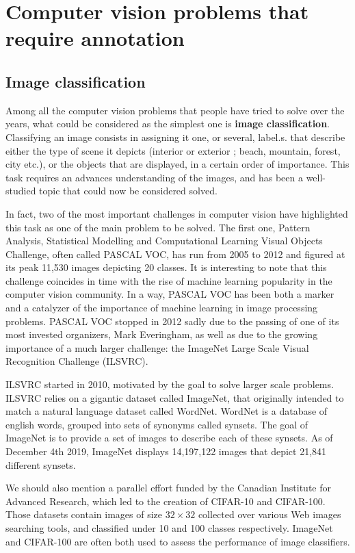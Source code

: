 \section{Computer vision problems that require annotation}
\label{sec:cv_annot} 

\subsection{Image classification} 
Among all the computer vision problems that people have tried to solve over the years, what could be considered as the simplest one is \textbf{image classification}. Classifying an image consists in assigning it one, or several, label.s. that describe either the type of scene it depicts (interior or exterior ; beach, mountain, forest, city etc.), or the objects that are displayed, in a certain order of importance. This task requires an advances understanding of the images, and has been a well-studied topic that could now be considered solved. 

In fact, two of the most important challenges in computer vision have highlighted this task as one of the main problem to be solved. The first one, Pattern Analysis, Statistical Modelling and Computational Learning Visual Objects Challenge, often called PASCAL VOC, has run from 2005 to 2012 and figured at its peak 11,530 images depicting 20 classes. It is interesting to note that this challenge coincides in time with the rise of machine learning popularity in the computer vision community. In a way, PASCAL VOC has been both a marker and a catalyzer of the importance of machine learning in image processing problems. PASCAL VOC stopped in 2012 sadly due to the passing of one of its most invested organizers, Mark Everingham, as well as due to the growing importance of a much larger challenge: the ImageNet Large Scale Visual Recognition Challenge (ILSVRC).

ILSVRC started in 2010, motivated by the goal to solve larger scale problems. ILSVRC relies on a gigantic dataset called ImageNet, that originally intended to match a natural language dataset called WordNet. WordNet is a database of english words, grouped into sets of synonyms called synsets. The goal of ImageNet is to provide a set of images to describe each of these synsets. As of December 4th 2019, ImageNet displays 14,197,122 images that depict 21,841 different synsets.

We should also mention a parallel effort funded by the Canadian Institute for Advanced Research, which led to the creation of CIFAR-10 and CIFAR-100. Those datasets contain images of size $32 \times 32$ collected over various Web images searching tools, and classified under 10 and 100 classes respectively. ImageNet and CIFAR-100 are often both used to assess the performance of image classifiers.

